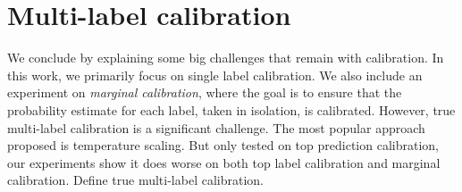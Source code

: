 \section{Multi-label calibration}

We conclude by explaining some big challenges that remain with calibration. In this work, we primarily focus on single label calibration. We also include an experiment on \emph{marginal calibration}, where the goal is to ensure that the probability estimate for each label, taken in isolation, is calibrated. However, true multi-label calibration is a significant challenge. The most popular approach proposed is temperature scaling. But only tested on top prediction calibration, our experiments show it does worse on both top label calibration and marginal calibration. Define true multi-label calibration. 